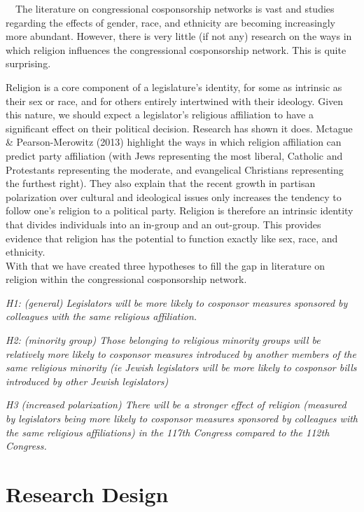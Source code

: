 \documentclass[Royal,times,sageh]{sagej}
\begin{document}
~~The literature on congressional cosponsorship networks is vast and
studies regarding the effects of gender, race, and ethnicity are
becoming increasingly more abundant. However, there is very little (if
not any) research on the ways in which religion influences the
congressional cosponsorship network. This is quite surprising.

Religion is a core component of a legislature's identity, for some as
intrinsic as their sex or race, and for others entirely intertwined with
their ideology. Given this nature, we should expect a legislator's
religious affiliation to have a significant effect on their political
decision. Research has shown it does. Mctague \& Pearson-Merowitz (2013)
highlight the ways in which religion affiliation can predict party
affiliation (with Jews representing the most liberal, Catholic and
Protestants representing the moderate, and evangelical Christians
representing the furthest right). They also explain that the recent
growth in partisan polarization over cultural and ideological issues
only increases the tendency to follow one's religion to a political
party. Religion is therefore an intrinsic identity that divides
individuals into an in-group and an out-group. This provides evidence
that religion has the potential to function exactly like sex, race, and
ethnicity.\\
With that we have created three hypotheses to fill the gap in literature
on religion within the congressional cosponsorship network.

\emph{H1: (general) Legislators will be more likely to cosponsor
measures sponsored by colleagues with the same religious affiliation.}

\emph{H2: (minority group) Those belonging to religious minority groups
will be relatively more likely to cosponsor measures introduced by
another members of the same religious minority (ie Jewish legislators
will be more likely to cosponsor bills introduced by other Jewish
legislators)}

\emph{H3 (increased polarization) There will be a stronger effect of
religion (measured by legislators being more likely to cosponsor
measures sponsored by colleagues with the same religious affiliations)
in the 117th Congress compared to the 112th Congress. }

\hypertarget{research-design}{%
\section{Research Design}\label{research-design}}
\end{document}
